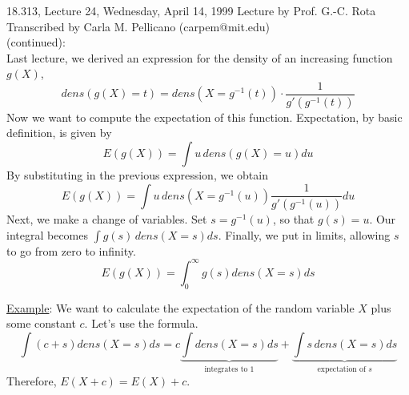 {\Large 18.313, Lecture 24, Wednesday, April 14, 1999}\newline
{\large Lecture by Prof. G.-C. Rota}\\
Transcribed by Carla M. Pellicano (carpem@mit.edu)\\

 (continued):\\

\noindent Last lecture, we derived an expression for the density of an increasing function $g(X)$,
$$dens(g(X)=t)=dens(X=g^{-1}(t))\cdot\frac{1}{g\prime(g^{-1}(t))}$$
Now we want to compute the expectation of this function.  Expectation, by basic definition, is given by
$$E(g(X))=\int u\,dens(g(X)=u)du$$
By substituting in the previous expression, we obtain
$$E(g(X))=\int u\,dens(X=g^{-1}(u))\frac{1}{g\prime(g^{-1}(u))}du$$
Next, we make a change of variables.  Set $s=g^{-1}(u)$, so that $g(s)=u$.  Our integral becomes $\int g(s)\,dens(X=s)ds$.  Finally, we put in limits, allowing $s$ to go from zero to infinity.
$$E(g(X))=\int_0^{\infty} g(s)dens(X=s)ds$$

\noindent\underline{Example}:  We want to calculate the expectation of the random variable $X$ plus some constant $c$.  Let's use the formula.  
$$\int(c+s)dens(X=s)ds=c\underbrace{\int\! dens(X=s)ds}_{\mbox{integrates to 1}}+\underbrace{\int\! s\,dens(X=s)ds}_{\mbox{expectation of $s$}}$$
Therefore, $E(X+c)=E(X)+c$.\\\\

